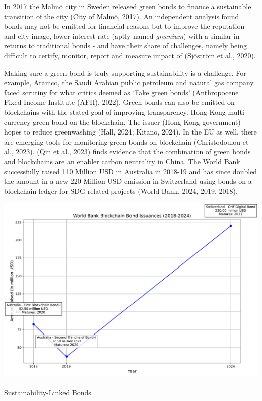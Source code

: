 \documentclass[
  letterpaper,
  DIV=11,
  numbers=noendperiod]{scrartcl}
\makeatletter
\let\oldparagraph\paragraph
\renewcommand{\paragraph}{
    \@ifstar
      \xxxParagraphStar
      \xxxParagraphNoStar
  }
\newcommand{\xxxParagraphStar}[1]{\oldparagraph*{#1}\mbox{}}
\newcommand{\xxxParagraphNoStar}[1]{\oldparagraph{#1}\mbox{}}
\makeatother
\begin{document}
In 2017 the Malmö city in Sweden released green bonds to finance a
sustainable transition of the city (City of Malmö, 2017). An independent
analysis found bonds may not be emitted for financial reasons but to
improve the reputation and city image, lower interest rate (aptly named
\emph{greenium}) with a similar in returns to traditional bonds - and
have their share of challenges, namely being difficult to certify,
monitor, report and measure impact of (Sjöström et al., 2020).

Making sure a green bond is truly supporting sustainability is a
challenge. For example, Aramco, the Saudi Arabian public petroleum and
natural gas company faced scrutiny for what critics deemed as `Fake
green bonds' (Anthropocene Fixed Income Institute (AFII), 2022). Green
bonds can also be emitted on blockchains with the stated goal of
improving transparency. Hong Kong multi-currency green bond on the
blockchain. The issuer (Hong Kong government) hopes to reduce
greenwashing (Hall, 2024; Kitano, 2024). In the EU as well, there are
emerging tools for monitoring green bonds on blockchain (Christodoulou
et al., 2023). (Qin et al., 2023) finds evidence that the combination of
green bonds and blockchains are an enabler carbon neutrality in China.
The World Bank successfully raised 110 Million USD in Australia in
2018-19 and has since doubled the amount in a new 220 Million USD
emission in Switzerland using bonds on a blockchain ledger for
SDG-related projects (World Bank, 2024, 2019, 2018).

\includegraphics{_thesis_files/figure-pdf/cell-38-output-1.pdf}

\paragraph{Sustainability-Linked
Bonds}\label{sustainability-linked-bonds}
\end{document}
